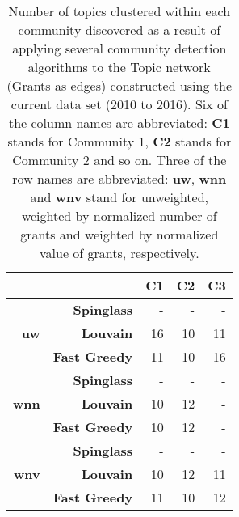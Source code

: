 \begin{table}[!htbp]
\centering
\caption[Number of topics clustered within each community discovered in the Topic network (Grants as edges) constructed using the current data set (2010 to 2016)]{Number of topics clustered within each community discovered as a result of applying several community detection algorithms to the Topic network (Grants as edges) constructed using the current data set (2010 to 2016). Six of the column names are abbreviated: \textbf{C1} stands for Community 1, \textbf{C2} stands for Community 2 and so on. Three of the row names are abbreviated: \textbf{uw}, \textbf{wnn} and \textbf{wnv} stand for unweighted, weighted by normalized number of grants and weighted by normalized value of grants, respectively.}
\label{table:researcher_b_current_numbers_appendix}
\begin{tabular}{r|r|r|r|r}
\textbf{} & \textbf{} & \textbf{C1} & \textbf{C2} & \textbf{C3}\\
\hline
\multirow{3}{*}{\textbf{uw}}
& \textbf{Spinglass} & {-} & {-} & {-}\\
& \textbf{Louvain} & {16} & {10} & {11}\\
& \textbf{Fast Greedy} & {11} & {10} & {16}\\
\hline
\multirow{3}{*}{\textbf{wnn}}
& \textbf{Spinglass} & {-} & {-} & {-}\\
& \textbf{Louvain} & {10} & {12} & {-}\\
& \textbf{Fast Greedy} & {10} & {12} & {-}\\
\hline
\multirow{3}{*}{\textbf{wnv}}
& \textbf{Spinglass} & {-} & {-} & {-}\\
& \textbf{Louvain} & {10} & {12} & {11}\\
& \textbf{Fast Greedy} & {11} & {10} & {12}
\end{tabular}
\end{table}

